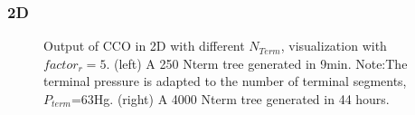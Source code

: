 \documentclass[a4paper, 11pt]{article} %
\begin{document}
\subsubsection{2D}
\begin{figure}[!h]
\centering
{}
\caption{Output of CCO in 2D with different $N_{Term}$, visualization with $ factor_r = 5 $. (left) A 250 Nterm tree generated in \unit{9}{min}. Note:The terminal pressure is adapted to the number of terminal segments, $P_{term}$=\unit{63}{\milli\meter}Hg. (right) A 4000 Nterm tree generated in 44 hours.}

\label{fig:CCO 2D}
\end{figure}
\end{document}
